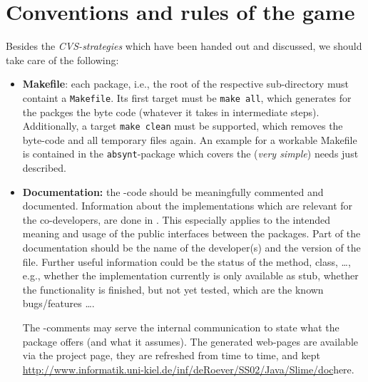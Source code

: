 


\section*{Conventions and rules of the game}
\label{sec:conventions}



Besides the \emph{CVS-strategies} which have been handed out and discussed,
we should take care of the following:

\begin{itemize}
\item \textbf{Makefile}: each package, i.e., the root of the respective
  sub-directory must containt a \texttt{Makefile}.  Its first target must
  be \texttt{make all}, which generates for the packges the \Java{} byte
  code (whatever it takes in intermediate steps).  Additionally, a target
  \texttt{make clean} must be supported, which removes the byte-code and
  all temporary files again.  An example for a workable Makefile is
  contained in the \texttt{absynt}-package which covers the (\emph{very
    simple}) needs just described.

  
\item \textbf{Documentation:} the \Java-code should be meaningfully
  commented and documented. Information about the implementations which are
  relevant for the co-developers, are done in \javadoc. This especially
  applies to the intended meaning and usage of the public interfaces
  between the packages. Part of the documentation should be the name of the
  developer(s) and the version of the file. Further useful information
  could be the status of the method, class, \ldots, e.g., whether the
  implementation currently is only available as stub, whether the
  functionality is finished, but not yet tested, which are the known
  bugs/features \ldots.
  
  The \javadoc-comments may serve the internal communication to state what
  the package offers (and what it assumes). The generated web-pages are
  available via the project page, they are refreshed from time to time, and
  kept
  \url{http://www.informatik.uni-kiel.de/inf/deRoever/SS02/Java/Slime/doc}{here}.
\end{itemize}



